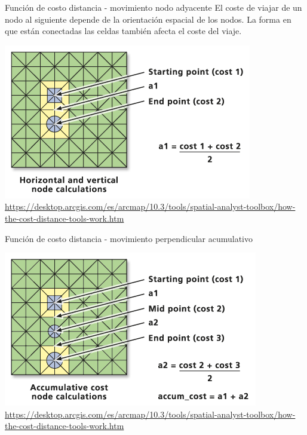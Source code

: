 \documentclass[12pt]{beamer}
\begin{document}
\begin{frame}{Función de costo distancia - movimiento nodo adyacente}
El coste de viajar de un nodo al siguiente depende de la orientación espacial de los nodos. La forma en que están conectadas las celdas también afecta el coste del viaje.\\

\begin{center}
\includegraphics[scale=2]{costo1.png}
\footnotesize\url{https://desktop.arcgis.com/es/arcmap/10.3/tools/spatial-analyst-toolbox/how-the-cost-distance-tools-work.htm}
\end{center}

\end{frame}

\begin{frame}{Función de costo distancia - movimiento perpendicular acumulativo}
\begin{center}
\includegraphics[scale=2]{costo2.png}
\footnotesize\url{https://desktop.arcgis.com/es/arcmap/10.3/tools/spatial-analyst-toolbox/how-the-cost-distance-tools-work.htm}
\end{center}
\end{frame}
\end{document}
